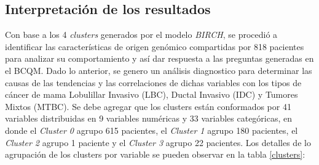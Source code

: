 \subsection{Interpretación de los resultados}
Con base a los 4 \textit{clusters} generados por el modelo \textit{BIRCH}, se procedió a identificar las características de origen genómico compartidas por 818 pacientes para analizar su comportamiento y así dar respuesta a las preguntas generadas en el BCQM. Dado lo anterior, se genero un análisis diagnostico para determinar las causas de las tendencias y las correlaciones de dichas variables con los tipos de cáncer de mama Lobulillar Invasivo (LBC), Ductal Invasivo (IDC) y Tumores Mixtos (MTBC). Se debe agregar que los clusters están conformados por 41 variables distribuidas en 9 variables numéricas y 33 variables categóricas, en donde el \textit{Cluster 0} agrupo 615 pacientes, el \textit{Cluster 1} agrupo 180 pacientes, el \textit{Cluster 2} agrupo 1 paciente y el \textit{Cluster 3} agrupo 22 pacientes. Los detalles de lo agrupación de los clusters por variable se pueden observar en la tabla \ref{clusters}:
